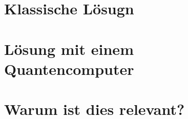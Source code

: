 \begin{refsection}
% 
\section{Klassische Lösugn}

\section{L\"osung mit einem Quantencomputer}

\section{Warum ist dies relevant?}

\printbibliography[heading=subbibliography] \end{refsection}


